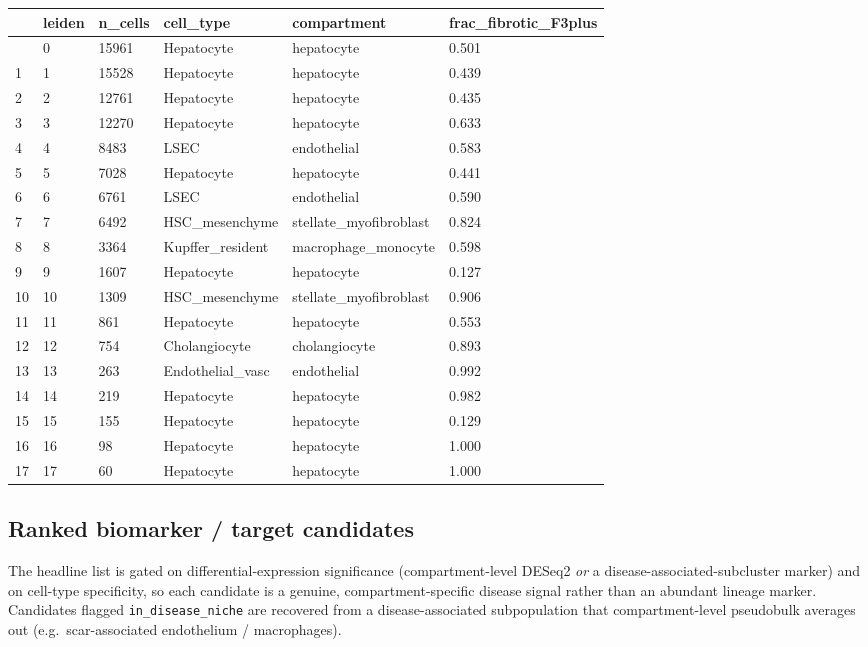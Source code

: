 \documentclass[
  letterpaper,
  DIV=11,
  numbers=noendperiod]{scrartcl}
\newcounter{none} %
\begin{document}
{\def\LTcaptype{none} %
\begin{longtable}[]{@{}llllll@{}}
\toprule\noalign{}
& leiden & n\_cells & cell\_type & compartment &
frac\_fibrotic\_F3plus \\
\midrule\noalign{}
\endhead
\bottomrule\noalign{}
\endlastfoot
0 & 0 & 15961 & Hepatocyte & hepatocyte & 0.501 \\
1 & 1 & 15528 & Hepatocyte & hepatocyte & 0.439 \\
2 & 2 & 12761 & Hepatocyte & hepatocyte & 0.435 \\
3 & 3 & 12270 & Hepatocyte & hepatocyte & 0.633 \\
4 & 4 & 8483 & LSEC & endothelial & 0.583 \\
5 & 5 & 7028 & Hepatocyte & hepatocyte & 0.441 \\
6 & 6 & 6761 & LSEC & endothelial & 0.590 \\
7 & 7 & 6492 & HSC\_mesenchyme & stellate\_myofibroblast & 0.824 \\
8 & 8 & 3364 & Kupffer\_resident & macrophage\_monocyte & 0.598 \\
9 & 9 & 1607 & Hepatocyte & hepatocyte & 0.127 \\
10 & 10 & 1309 & HSC\_mesenchyme & stellate\_myofibroblast & 0.906 \\
11 & 11 & 861 & Hepatocyte & hepatocyte & 0.553 \\
12 & 12 & 754 & Cholangiocyte & cholangiocyte & 0.893 \\
13 & 13 & 263 & Endothelial\_vasc & endothelial & 0.992 \\
14 & 14 & 219 & Hepatocyte & hepatocyte & 0.982 \\
15 & 15 & 155 & Hepatocyte & hepatocyte & 0.129 \\
16 & 16 & 98 & Hepatocyte & hepatocyte & 1.000 \\
17 & 17 & 60 & Hepatocyte & hepatocyte & 1.000 \\
\end{longtable}
}

\subsection{Ranked biomarker / target
candidates}\label{ranked-biomarker-target-candidates}

The headline list is gated on differential-expression significance
(compartment-level DESeq2 \emph{or} a disease-associated-subcluster
marker) and on cell-type specificity, so each candidate is a genuine,
compartment-specific disease signal rather than an abundant lineage
marker. Candidates flagged \texttt{in\_disease\_niche} are recovered
from a disease-associated subpopulation that compartment-level
pseudobulk averages out (e.g.~scar-associated endothelium /
macrophages).
\end{document}
